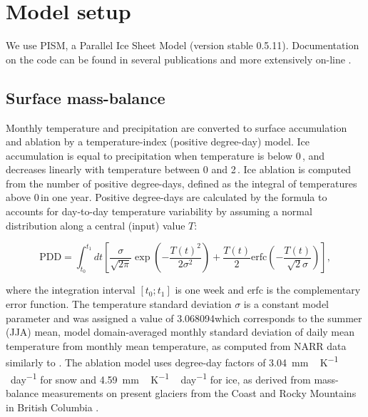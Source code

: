 \section{Model setup}
\label{sec:model}

We use PISM, a Parallel Ice Sheet Model (version stable 0.5.11). Documentation on the code can be found in several publications \citep[e.g.,][]{bueler-brown-2009,winkelmann-etal-2011,aschwanden-etal-2012} and more extensively on-line \citep[{\url{http://www.pism-docs.org}},][]{web:pism}.

\subsection{Surface mass-balance}

Monthly temperature and precipitation are converted to surface accumulation and ablation by a temperature-index (positive degree-day) model. Ice accumulation is equal to precipitation when temperature is below 0\,\degC, and decreases linearly with temperature between 0 and 2\,\degC. Ice ablation is computed from the number of positive degree-days, defined as the integral of temperatures above 0\,\degC in one year. Positive degree-days are calculated by the \citet{calov-greve-2005} formula to accounts for day-to-day temperature variability by assuming a normal distribution along a central (input) value $T$:

\begin{equation}
	\mathrm{PDD} = \int_{t_0}^{t_1} dt \left[
		\frac{\sigma}{\sqrt{2\pi}}
		\exp\left({-\frac{T(t)^2}{2\sigma^2}}\right)
		+\frac{T(t)}{2}
		\mathrm{erfc} \left(-\frac{T(t)}{\sqrt{2}\sigma}\right)
	\right],
\end{equation}

where the integration interval $[t_0; t_1]$ is one week and $\mathrm{erfc}$ is the complementary error function. The temperature standard deviation $\sigma$  is a constant model parameter and was assigned a value of 3.068094\degC which corresponds to the summer (JJA) mean, model domain-averaged monthly standard deviation of daily mean temperature from monthly mean temperature, as computed from NARR data similarly to \citet{seguinot-inreview}. The ablation model uses degree-day factors of 3.04~\unit{mm\,K^{-1}\,day^{-1}} for snow and 4.59~\unit{mm\,K^{-1}\,day^{-1}} for ice, as derived from mass-balance measurements on present glaciers from the Coast and Rocky Mountains in British Columbia \citep{shea-etal-2009}.

